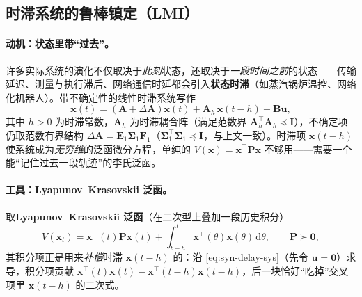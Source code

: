\subsection{时滞系统的鲁棒镇定（LMI）}
\label{sec:syn-delay}

\paragraph{动机：状态里带“过去”。}
许多实际系统的演化不仅取决于\emph{此刻}状态，还取决于\emph{一段时间之前}的状态——传输延迟、测量与执行滞后、网络通信时延都会引入\textbf{状态时滞}（如蒸汽锅炉温控、网络化机器人）。带不确定性的线性时滞系统写作\cite{zhang2017modern}
\begin{equation}
  \dot{\mathbf x}(t)=(\mathbf A+\Delta\mathbf A)\mathbf x(t)+\mathbf A_h\,\mathbf x(t-h)+\mathbf B\mathbf u,
  \label{eq:syn-delay-sys}
\end{equation}
其中 $h>0$ 为时滞常数，$\mathbf A_h$ 为时滞耦合阵（满足范数界 $\mathbf A_h^\top\mathbf A_h\preceq\mathbf I$），不确定项仍取范数有界结构 $\Delta\mathbf A=\mathbf E_1\boldsymbol\Sigma_1\mathbf F_1$（$\boldsymbol\Sigma_1^\top\boldsymbol\Sigma_1\preceq\mathbf I$，与上文一致）。时滞项 $\mathbf x(t-h)$ 使系统成为\emph{无穷维}的泛函微分方程，单纯的 $V(\mathbf x)=\mathbf x^\top\mathbf P\mathbf x$ 不够用——需要一个能“记住过去一段轨迹”的李氏泛函。

\paragraph{工具：Lyapunov--Krasovskii 泛函。}
取\textbf{Lyapunov--Krasovskii 泛函}（在二次型上叠加一段历史积分）
\begin{equation}
  V(\mathbf x_t)=\mathbf x^\top(t)\mathbf P\mathbf x(t)+\int_{t-h}^{t}\mathbf x^\top(\theta)\mathbf x(\theta)\,\mathrm d\theta,\qquad \mathbf P\succ\mathbf 0,
  \label{eq:syn-delay-lk}
\end{equation}
其积分项正是用来\emph{补偿}时滞 $\mathbf x(t-h)$ 的：沿 \cref{eq:syn-delay-sys}（先令 $\mathbf u=\mathbf 0$）求导，积分项贡献 $\mathbf x^\top(t)\mathbf x(t)-\mathbf x^\top(t-h)\mathbf x(t-h)$，后一块恰好“吃掉”交叉项里 $\mathbf x(t-h)$ 的二次式。

